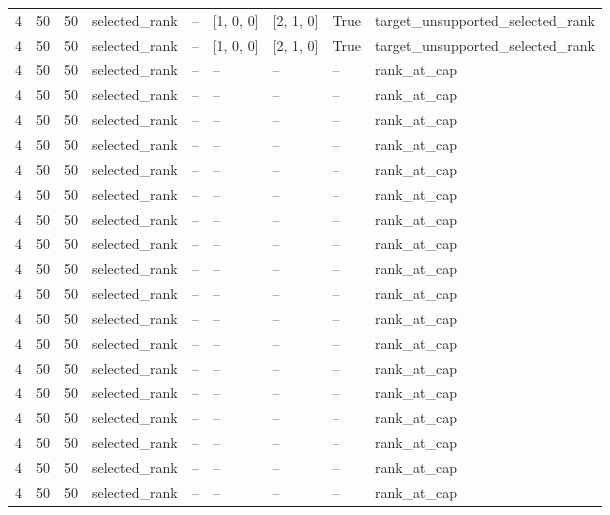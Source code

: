\begin{longtable}{lllllllll}
4 & 50 & 50 & selected\_rank & -- & [1, 0, 0] & [2, 1, 0] & True & target\_unsupported\_selected\_rank \\
4 & 50 & 50 & selected\_rank & -- & [1, 0, 0] & [2, 1, 0] & True & target\_unsupported\_selected\_rank \\
4 & 50 & 50 & selected\_rank & -- & -- & -- & -- & rank\_at\_cap \\
4 & 50 & 50 & selected\_rank & -- & -- & -- & -- & rank\_at\_cap \\
4 & 50 & 50 & selected\_rank & -- & -- & -- & -- & rank\_at\_cap \\
4 & 50 & 50 & selected\_rank & -- & -- & -- & -- & rank\_at\_cap \\
4 & 50 & 50 & selected\_rank & -- & -- & -- & -- & rank\_at\_cap \\
4 & 50 & 50 & selected\_rank & -- & -- & -- & -- & rank\_at\_cap \\
4 & 50 & 50 & selected\_rank & -- & -- & -- & -- & rank\_at\_cap \\
4 & 50 & 50 & selected\_rank & -- & -- & -- & -- & rank\_at\_cap \\
4 & 50 & 50 & selected\_rank & -- & -- & -- & -- & rank\_at\_cap \\
4 & 50 & 50 & selected\_rank & -- & -- & -- & -- & rank\_at\_cap \\
4 & 50 & 50 & selected\_rank & -- & -- & -- & -- & rank\_at\_cap \\
4 & 50 & 50 & selected\_rank & -- & -- & -- & -- & rank\_at\_cap \\
4 & 50 & 50 & selected\_rank & -- & -- & -- & -- & rank\_at\_cap \\
4 & 50 & 50 & selected\_rank & -- & -- & -- & -- & rank\_at\_cap \\
4 & 50 & 50 & selected\_rank & -- & -- & -- & -- & rank\_at\_cap \\
4 & 50 & 50 & selected\_rank & -- & -- & -- & -- & rank\_at\_cap \\
4 & 50 & 50 & selected\_rank & -- & -- & -- & -- & rank\_at\_cap \\
4 & 50 & 50 & selected\_rank & -- & -- & -- & -- & rank\_at\_cap \\
\bottomrule
\end{longtable}
\endgroup
